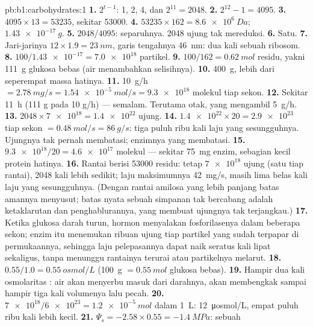 \begin{solution}{pb:b1:carbohydrates:1}
\textbf{1.} $2^{t-1}$: 1, 2, 4, dan $2^{11} = 2048$.
\textbf{2.} $2^{12} - 1 = 4095$.
\textbf{3.} $4095\times 13 = \num{53235}$, sekitar \num{53000}.
\textbf{4.} $\num{53235}\times 162 = \qty{8.6e6}{Da}$;
$\qty{1.43e-17}{g}$.
\textbf{5.} $2048/4095$: separuhnya. \num{2048} ujung tak mereduksi.
\textbf{6.} Satu.
\textbf{7.} Jari-jarinya $12\times 1.9 = \qty{23}{nm}$, garis tengahnya
\qty{46}{nm}: dua kali sebuah ribosom.
\textbf{8.} $100/\num{1.43e-17} = \num{7.0e18}$ partikel.
\textbf{9.} $100/162 = \qty{0.62}{mol}$ residu, yakni \qty{111}{g}
glukosa bebas (air  menambahkan selisihnya).
\textbf{10.} \qty{400}{g}, lebih dari seperempat massa hatinya.
\textbf{11.} \qty{10}{g/h} $= \qty{2.78}{mg/s} = \qty{1.54e-5}{mol/s} =
\num{9.3e18}$ molekul tiap sekon.
\textbf{12.} Sekitar \qty{11}{h} (111 g pada 10 g/h) --- semalam.
Terutama otak, yang mengambil \qty{5}{g/h}.
\textbf{13.} $2048\times\num{7e18} = \num{1.4e22}$ ujung.
\textbf{14.} $\num{1.4e22}\times 20 = \num{2.9e23}$ tiap sekon $=
\qty{0.48}{mol/s} = \qty{86}{g/s}$: tiga puluh ribu kali laju yang
sesungguhnya. Ujungnya tak pernah membatasi; enzimnya yang membatasi.
\textbf{15.} $\num{9.3e18}/20 = \num{4.6e17}$ molekul --- sekitar
\qty{75}{mg} enzim, sebagian kecil protein hatinya.
\textbf{16.} Rantai berisi \num{53000} residu: tetap $\num{7e18}$ ujung
(satu tiap rantai), \num{2048} kali lebih sedikit; laju maksimumnya
\qty{42}{mg/s}, masih lima belas kali laju yang sesungguhnya. (Dengan
rantai amilosa yang lebih panjang batas amannya menyusut; batas nyata
sebuah simpanan tak bercabang adalah ketaklarutan dan penghablurannya,
yang membuat ujungnya tak terjangkau.)
\textbf{17.} Ketika glukosa darah turun, hormon menyalakan
fosforilasenya dalam beberapa sekon; enzim itu menemukan ribuan ujung
tiap partikel yang sudah terpapar di permukaannya, sehingga laju
pelepasannya dapat naik seratus kali lipat sekaligus, tanpa menunggu
rantainya terurai atau partikelnya melarut.
\textbf{18.} $0.55/1.0 = \qty{0.55}{osmol/L}$ (\qty{100}{g}
$= \qty{0.55}{mol}$ glukosa bebas).
\textbf{19.} Hampir dua kali osmolaritas : air akan menyerbu
masuk dari darahnya,  akan membengkak sampai hampir tiga kali
volumenya lalu pecah.
\textbf{20.} $\num{7e18}/\num{6e23} = \qty{1.2e-5}{mol}$ dalam
\qty{1}{L}: \qty{12}{\micro osmol/L}, empat puluh ribu kali lebih kecil.
\textbf{21.} $\Psi_s = -2.58\times 0.55 = \qty{-1.4}{MPa}$: sebuah

\end{solution}
